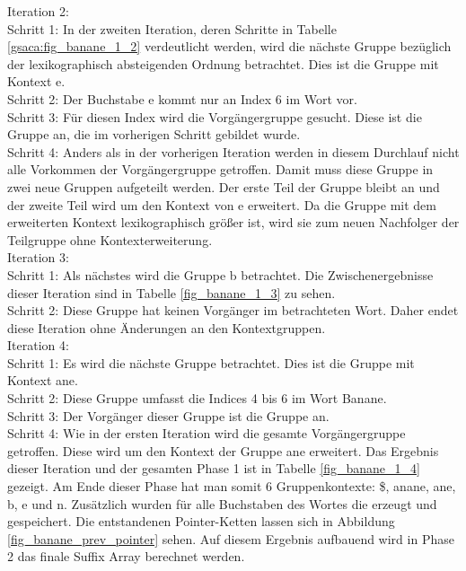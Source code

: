 Iteration 2:\\
Schritt 1: In der zweiten Iteration, deren Schritte in Tabelle \ref{gsaca:fig_banane_1_2} verdeutlicht werden, wird die nächste Gruppe bezüglich der lexikographisch absteigenden Ordnung betrachtet. 
Dies ist die Gruppe mit Kontext e.\\
Schritt 2: Der Buchstabe e kommt nur an Index 6 im Wort vor.\\
Schritt 3: Für diesen Index wird die Vorgängergruppe gesucht. 
Diese ist die Gruppe an, die im vorherigen Schritt gebildet wurde.\\
Schritt 4: Anders als in der vorherigen Iteration werden in diesem Durchlauf nicht alle Vorkommen der Vorgängergruppe getroffen. 
Damit muss diese Gruppe in zwei neue Gruppen aufgeteilt werden. 
Der erste Teil der Gruppe bleibt an und der zweite Teil wird um den Kontext von e erweitert. 
Da die Gruppe mit dem erweiterten Kontext lexikographisch größer ist, wird sie zum neuen Nachfolger der Teilgruppe ohne Kontexterweiterung.\\

Iteration 3:\\
Schritt 1: Als nächstes wird die Gruppe b betrachtet. 
Die Zwischenergebnisse dieser Iteration sind in Tabelle \ref{fig_banane_1_3} zu sehen.\\
Schritt 2: Diese Gruppe hat keinen Vorgänger im betrachteten Wort. 
Daher endet diese Iteration ohne Änderungen an den Kontextgruppen.\\

Iteration 4: \\
Schritt 1: Es wird die nächste Gruppe betrachtet. Dies ist die Gruppe mit Kontext ane.\\
Schritt 2: Diese Gruppe umfasst die Indices 4 bis 6 im Wort Banane.\\
Schritt 3: Der Vorgänger dieser Gruppe ist die Gruppe an.\\
Schritt 4: Wie in der ersten Iteration wird die gesamte Vorgängergruppe getroffen. 
Diese wird um den Kontext der Gruppe ane erweitert. 
Das Ergebnis dieser Iteration und der gesamten Phase 1 ist in Tabelle \ref{fig_banane_1_4} gezeigt. 
Am Ende dieser Phase hat man somit 6 Gruppenkontexte: \$, anane, ane, b, e und n. 
Zusätzlich wurden für alle Buchstaben des Wortes die \prevpointer erzeugt und gespeichert. 
Die entstandenen Pointer-Ketten lassen sich in Abbildung \ref{fig_banane_prev_pointer} sehen. 
Auf diesem Ergebnis aufbauend wird in Phase 2 das finale Suffix Array berechnet werden.
\newpage		%

